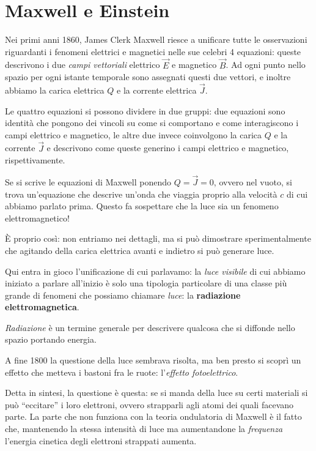\documentclass{article}
\begin{document}
\section{Maxwell e Einstein}

Nei primi anni 1860, James Clerk Maxwell riesce a unificare tutte le osservazioni riguardanti i fenomeni elettrici e magnetici nelle sue celebri 4 equazioni: queste descrivono i due \emph{campi vettoriali} elettrico \(\vec{E}\) e magnetico \(\vec{B}\). 
Ad ogni punto nello spazio per ogni istante temporale sono assegnati questi due vettori, e inoltre abbiamo la carica elettrica \(Q\) e la corrente elettrica \(\vec{J}\). 

Le quattro equazioni si possono dividere in due gruppi: due equazioni sono identità che pongono dei vincoli su come si comportano e come interagiscono i campi elettrico e magnetico, le altre due invece coinvolgono la carica \(Q\) e la corrente \(\vec{J}\) e descrivono come queste generino i campi elettrico e magnetico, rispettivamente. 

Se si scrive le equazioni di Maxwell ponendo \(Q = \vec{J} = 0\), ovvero nel vuoto, si trova un'equazione che descrive un'onda che viaggia proprio alla velocità \(c\) di cui abbiamo parlato prima. 
Questo fa sospettare che la luce sia un fenomeno elettromagnetico! 

È proprio così: non entriamo nei dettagli, ma si può dimostrare sperimentalmente che agitando della carica elettrica avanti e indietro si può generare luce.

Qui entra in gioco l'unificazione di cui parlavamo: la \emph{luce visibile} di cui abbiamo iniziato a parlare all'inizio è solo una tipologia particolare di una classe più grande di fenomeni che possiamo chiamare \emph{luce}: la \textbf{radiazione elettromagnetica}.

\emph{Radiazione} è un termine generale per descrivere qualcosa che si diffonde nello spazio portando energia.


A fine 1800 la questione della luce sembrava risolta, ma ben presto si scoprì un effetto che metteva i bastoni fra le ruote: l'\emph{effetto fotoelettrico}.

Detta in sintesi, la questione è questa: se si manda della luce su certi materiali si può ``eccitare'' i loro elettroni, ovvero strapparli agli atomi dei quali facevano parte.
La parte che non funziona con la teoria ondulatoria di Maxwell è il fatto che, mantenendo la stessa intensità di luce ma aumentandone la \emph{frequenza} l'energia cinetica degli elettroni strappati aumenta. 
\end{document}
